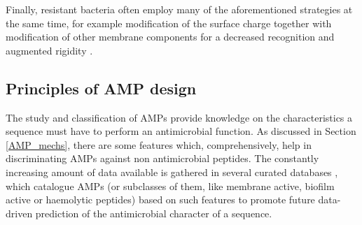 Finally, resistant bacteria often employ many of the aforementioned strategies at the same time, for example modification of the surface charge together with modification of other membrane components for a decreased recognition and augmented rigidity \cite{Band2014}.


\subsection{Principles of AMP design} \label{sec:amp_design}

The study and classification of AMPs provide knowledge on the characteristics a sequence must have to perform an antimicrobial function.
%
As discussed in Section \ref{AMP_mechs}, there are some features which, comprehensively, help in discriminating AMPs against non antimicrobial peptides. The constantly increasing amount of data available is gathered in several curated databases \cite{APD3,DBAASP2,dbAMP,antiBP2,amPEP}, which catalogue AMPs (or subclasses of them, like membrane active, biofilm active or haemolytic peptides) based on such features to promote future data-driven prediction of the antimicrobial character of a sequence.

